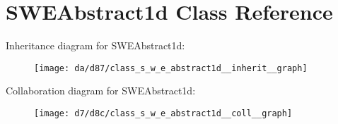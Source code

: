 \hypertarget{class_s_w_e_abstract1d}{}\section{S\+W\+E\+Abstract1d Class Reference}
\label{class_s_w_e_abstract1d}


Inheritance diagram for S\+W\+E\+Abstract1d\+:
\nopagebreak
\begin{figure}[H]
\begin{center}
\leavevmode
\texttt{[image: da/d87/class\_s\_w\_e\_abstract1d\_\_inherit\_\_graph]}
\end{center}
\end{figure}


Collaboration diagram for S\+W\+E\+Abstract1d\+:
\nopagebreak
\begin{figure}[H]
\begin{center}
\leavevmode
\texttt{[image: d7/d8c/class\_s\_w\_e\_abstract1d\_\_coll\_\_graph]}
\end{center}
\end{figure}

